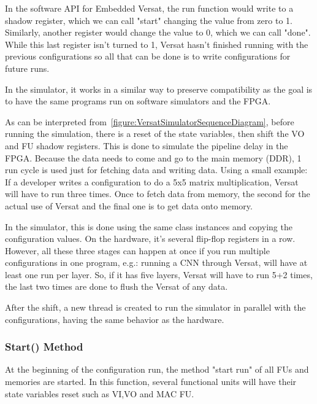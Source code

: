 \documentclass[conference]{IEEEtran}
\begin{document}
In the software API for Embedded Versat, the run function would write to a shadow register,
which we can call "start" changing the value from zero to 1. 
Similarly, another register would
change the value to 0, which we can call "done". While this last register isn't turned to 1, 
Versat hasn't finished running with the 
previous configurations so all that can be done is to write
configurations for future runs.

In the simulator, it works in a similar way to preserve compatibility 
as the goal is to have the same
programs run on software simulators and the FPGA.

% 

As can be interpreted from~\ref{figure:VersatSimulatorSequenceDiagram}, before running the simulation, there is a reset of the state variables, then shift the 
VO and FU shadow registers.
This is done to simulate the pipeline delay in the FPGA. 
Because the data needs to come and go to the main memory (DDR),
1 run cycle is used just for fetching data and writing data. 
Using a small example:
If a developer writes a configuration to do a 5x5 matrix multiplication, 
Versat will have to run three  times.
Once to fetch data from memory, the second for the actual use of Versat 
and the final one is to get data onto memory.

In the simulator, this is done using the same class instances and 
copying the configuration values. On the hardware, it's several flip-flop registers in a row.
However, all these three  stages can happen at once if you run multiple configurations in one program, 
e.g.: running a CNN
through Versat, will have at least one run per layer. 
So, if it has five layers, Versat will have to run 5+2 times, the last two times are done to
flush the Versat of any data.

After the shift, a new thread is created to run the simulator in parallel 
with the configurations,
having the same behavior as the hardware.

\subsubsection{Start() Method}

At the beginning of the configuration run, the method "start run" of 
all FUs and memories are started.
In this function, several functional units will have their state variables 
reset such as VI,VO and MAC FU.
\end{document}
